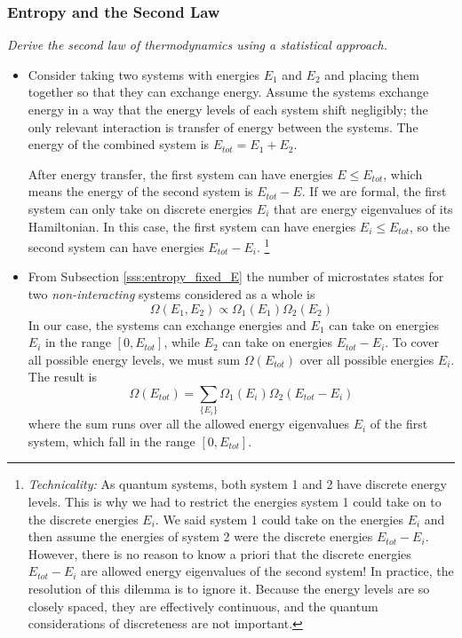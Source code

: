 \documentclass[11pt, a4paper]{article}
\begin{document}
\subsubsection{Entropy and the Second Law}
\textit{Derive the second law of thermodynamics using a statistical approach.}
\begin{itemize}
	\item Consider taking two systems with energies $ E_{1} $ and $ E_{2} $ and placing them together so that they can exchange energy. Assume the systems exchange energy in a way that the energy levels of each system shift negligibly; the only relevant interaction is transfer of energy between the systems. The energy of the combined system is $ E_{tot} = E_{1} + E_{2} $.
	
	After energy transfer, the first system can have energies $ E \leq E_{tot} $, which means the energy of the second system is $ E_{tot} - E $. If we are formal, the first system can only take on discrete energies $ E_{i} $ that are energy eigenvalues of its Hamiltonian. In this case, the first system can have energies $ E_{i} \leq E_{tot} $, so the second system can have energies $ E_{tot} - E_{i} $. \footnote{\textit{Technicality:} As quantum systems, both system 1 and 2 have discrete energy levels. This is why we had to restrict the energies system 1 could take on to the discrete energies $ E_{i} $. We said system 1 could take on the energies $ E_{i} $ and then assume the energies of system 2 were the discrete energies $ E_{tot} - E_{i} $. However, there is no reason to know a priori that the discrete energies $ E_{tot} - E_{i} $ are allowed energy eigenvalues of the second system! In practice, the resolution of this dilemma is to ignore it. Because the energy levels are so closely spaced, they are effectively continuous, and the quantum considerations of discreteness are not important.}
	
	
	\item From Subsection \ref{sss:entropy_fixed_E}  the number of microstates states for two \textit{non-interacting} systems considered as a whole is
	\begin{equation*}
		\Omega(E_{1}, E_{2}) \propto \Omega_{1}(E_{1})\Omega_{2}(E_{2})
	\end{equation*}
	In our case, the systems can exchange energies and $ E_{1} $ can take on energies $ E_{i} $ in the range $ [0, E_{tot}] $, while $ E_{2} $ can take on energies $ E_{tot} - E_{i} $. To cover all possible energy levels, we must sum $ \Omega(E_{tot}) $ over all possible energies $ E_{i} $. The result is 
	\begin{equation*}
		\Omega(E_{tot}) = \sum_{\{E_{i}\}}\Omega_{1}(E_{i})\Omega_{2}(E_{tot} - E_{i})
	\end{equation*}
	where the sum runs over all the allowed energy eigenvalues $ E_{i} $ of the first system, which fall in the range $ [0, E_{tot}] $.
	

\end{itemize}
\end{document}
